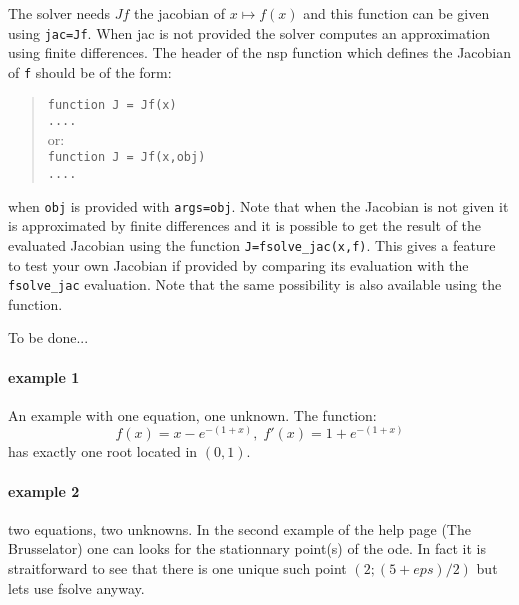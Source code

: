 \begin{mandescription}
The solver needs $Jf$ the jacobian of $x \mapsto f(x)$ and this function can be given using 
\verb+jac=Jf+. When jac is not provided the solver computes an approximation using finite differences. 
The header of the nsp function which defines the Jacobian of \verb+f+ should be of the form:
\begin{quote}
{\tt function J = Jf(x) \\
      ....}\\
or:\\
{\tt function J = Jf(x,obj) \\
     ....}
\end{quote}
when {\tt obj} is provided with {\tt args=obj}. 
Note that when the Jacobian is not given it is approximated by finite differences and it is 
possible to get the result of the evaluated Jacobian using the function \verb+J=fsolve_jac(x,f)+.
This gives a feature to test your own Jacobian if provided by comparing its evaluation with the 
\verb+fsolve_jac+ evaluation. Note that the same possibility is also available using the 
 function. 

To be done...
\end{mandescription} 

\begin{examples}
  
\paragraph{example 1} An example with one equation, one unknown. The function:
$$
  f(x) = x - e^{-(1+x)}, \; f'(x) = 1 + e^{-(1+x)}
$$ 
has exactly one root located in $(0,1)$.
\begin{program}
\end{program}
 
\paragraph{example 2} two equations, two unknowns. In the second example
of the  help page (The Brusselator) one can looks for
the stationnary point(s) of the ode. In fact it is straitforward to see
that there is one unique such point $(2;(5+eps)/2)$ but lets use fsolve
anyway.
\begin{program}
\end{program}
\end{examples}

